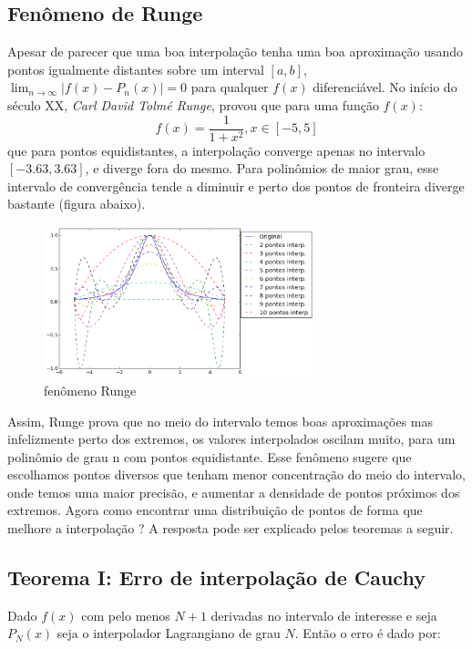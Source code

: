 \pagebreak
\newpage

\subsection{Fenômeno de Runge}
 Apesar de parecer que uma boa interpolação tenha uma boa aproximação usando pontos igualmente distantes sobre um interval $[a,b]$, $\lim_{n \rightarrow \infty} |f(x) - P_n(x)| = 0$ para qualquer $f(x)$ diferenciável.
 No início do século XX, \emph{Carl David Tolmé Runge}, provou que para uma função $f(x)$:
 \begin{equation}
 f(x) = \frac{1}{1 + x^2} , x \in [-5,5]
 \end{equation}
 que para pontos equidistantes, a interpolação converge apenas no intervalo $[-3.63,3.63]$, e diverge fora do mesmo. Para polinômios de maior grau, esse intervalo de convergência tende a diminuir e perto dos pontos de fronteira diverge bastante (figura abaixo).

\begin{figure}[htp]
\includegraphics[width=0.7\textwidth, center]{figuras/fenomeno_runge.png}
\caption{fenômeno Runge}
\end{figure}

 Assim, Runge prova que no meio do intervalo temos boas aproximações mas infelizmente perto dos extremos, os valores interpolados oscilam muito, para um polinômio de grau n com pontos equidistante. Esse fenômeno sugere que escolhamos pontos diversos que tenham menor concentração do meio do intervalo, onde temos uma maior precisão, e aumentar a densidade de pontos próximos dos extremos.
 Agora como encontrar uma distribuição de pontos de forma que melhore a interpolação ? A resposta pode ser explicado pelos teoremas a seguir.
\pagebreak
\subsection{ Teorema I: Erro de interpolação de Cauchy}

 Dado $f(x)$  com pelo menos $N+1$ derivadas no intervalo de interesse e seja $P_N(x)$ seja o interpolador Lagrangiano de grau $N$. Então o erro é dado por:
 
